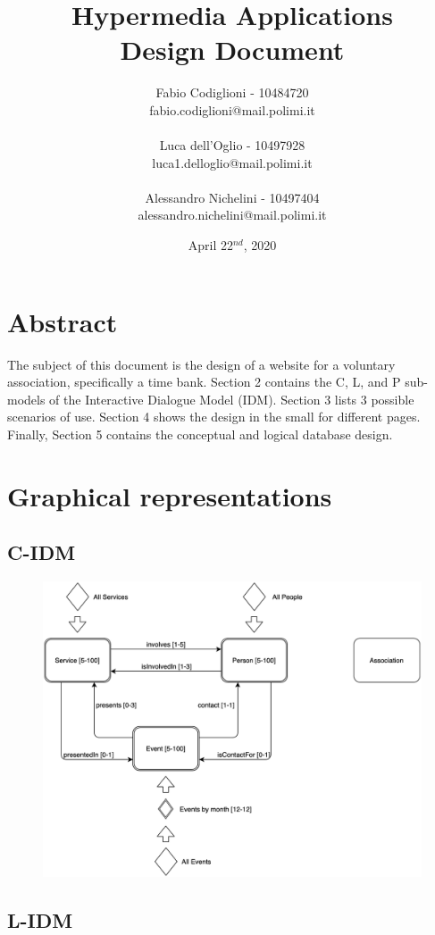 \documentclass[a4paper, 11pt, parskip=half, headsepline]{scrreprt}
\title{Hypermedia Applications\\Design Document}
\author{Fabio Codiglioni - 10484720\\fabio.codiglioni@mail.polimi.it\\\\Luca dell'Oglio - 10497928\\luca1.delloglio@mail.polimi.it\\\\Alessandro Nichelini - 10497404\\alessandro.nichelini@mail.polimi.it}
\date{April 22$^{nd}$, 2020}
\begin{document}
\maketitle
\tableofcontents
\newpage
{}


\chapter{Abstract}
The subject of this document is the design of a website for a voluntary association, specifically a time bank. Section 2 contains the C, L, and P sub-models of the Interactive Dialogue Model (IDM). Section 3 lists 3 possible scenarios of use. Section 4 shows the design in the small for different pages. Finally, Section 5 contains the conceptual and logical database design.

\chapter{Graphical representations}

\section{C-IDM}

\begin{figure}[H]
    \centering
    \includegraphics[width=0.85\linewidth, keepaspectratio]{IDM/C-IDM}
\end{figure}

\newpage
\section{L-IDM}
\end{document}
